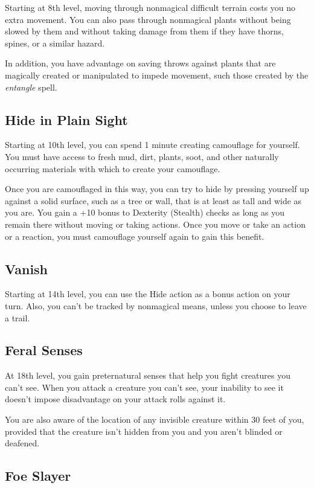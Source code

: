 Starting at 8th level, moving through nonmagical difficult terrain costs you no extra movement. You can also pass through nonmagical plants without being slowed by them and without taking damage from them if they have thorns, spines, or a similar hazard.

In addition, you have advantage on saving throws against plants that are magically created or manipulated to impede movement, such those created by the \textit{entangle} spell.

\subsection{Hide in Plain Sight}

Starting at 10th level, you can spend 1 minute creating camouflage for yourself. You must have access to fresh mud, dirt, plants, soot, and other naturally occurring materials with which to create your camouflage.

Once you are camouflaged in this way, you can try to hide by pressing yourself up against a solid surface, such as a tree or wall, that is at least as tall and wide as you are. You gain a +10 bonus to Dexterity (Stealth) checks as long as you remain there without moving or taking actions. Once you move or take an action or a reaction, you must camouflage yourself again to gain this benefit.

\subsection{Vanish}

Starting at 14th level, you can use the Hide action as a bonus action on your turn. Also, you can't be tracked by nonmagical means, unless you choose to leave a trail.

\subsection{Feral Senses}

At 18th level, you gain preternatural senses that help you fight creatures you can't see. When you attack a creature you can't see, your inability to see it doesn't impose disadvantage on your attack rolls against it.

You are also aware of the location of any invisible creature within 30 feet of you, provided that the creature isn't hidden from you and you aren't blinded or deafened.

\subsection{Foe Slayer}

